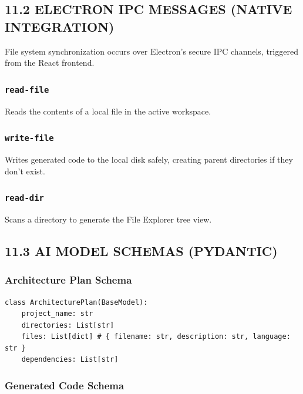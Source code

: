 \documentclass[
  12pt,
]{article}
\begin{document}
\subsection{11.2 ELECTRON IPC MESSAGES (NATIVE
INTEGRATION)}\label{electron-ipc-messages-native-integration}

File system synchronization occurs over Electron's secure IPC channels,
triggered from the React frontend.

\subsubsection{\texorpdfstring{\texttt{read-file}}{read-file}}\label{read-file}

Reads the contents of a local file in the active workspace.

\subsubsection{\texorpdfstring{\texttt{write-file}}{write-file}}\label{write-file}

Writes generated code to the local disk safely, creating parent
directories if they don't exist.

\subsubsection{\texorpdfstring{\texttt{read-dir}}{read-dir}}\label{read-dir}

Scans a directory to generate the File Explorer tree view.

\subsection{11.3 AI MODEL SCHEMAS
(PYDANTIC)}\label{ai-model-schemas-pydantic}

\subsubsection{Architecture Plan Schema}\label{architecture-plan-schema}

\begin{verbatim}
class ArchitecturePlan(BaseModel):
    project_name: str
    directories: List[str]
    files: List[dict] # { filename: str, description: str, language: str }
    dependencies: List[str]
\end{verbatim}

\subsubsection{Generated Code Schema}\label{generated-code-schema}
\end{document}
